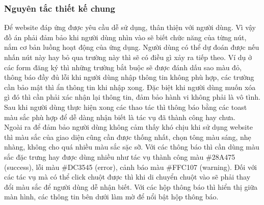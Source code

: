 \documentclass{article}
\begin{document}
\subsubsection{Nguyên tắc thiết kế chung}
Để website đáp ứng được yêu cầu dễ sử dụng, thân thiện với người dùng. Vì vậy đồ án phải đảm bảo khi người dùng nhìn vào sẽ biết chức năng của từng nút, nắm cơ bản luồng hoạt động của ứng dụng. Người dùng có thể dự đoán được nếu nhấn nút này hay bỏ qua trường này thì sẽ có điều gì xảy ra tiếp theo. Ví dụ ở các form đăng ký thì những trường bắt buộc sẽ được đánh dấu sao màu đỏ, thông báo đầy đủ lỗi khi người dùng nhập thông tin không phù hợp, các trường cần bảo mật thì ẩn thông tin khi nhập xong. Đặc biệt khi người dùng muốn xóa gì đó thì cần phải xác nhận lại thông tin, đảm bảo hành vi không phải là vô tình. Sau khi người dùng thực hiện xong các thao tác thì thông báo bằng các toast màu sắc phù hợp để dễ dàng nhận biết là tác vụ đã thành công hay chưa. \\
Ngoài ra để đảm bảo người dùng không cảm thấy khó chịu khi sử dụng website thì màu sắc của giao diện cũng cần được thống nhất, chọn tông màu sáng, nhẹ nhàng, không cho quá nhiều màu sắc sặc sỡ. Với các thông báo thì cần dùng màu sắc đặc trưng hay được dùng nhiều như tác vụ thành công màu \#28A475 (success), lỗi màu \#DC3545 (error), cảnh báo màu \#FFC107 (warning). Đối với các tác vụ mà có thể click chuột được thì khi di chuyển chuột vào sẽ phải thay đổi màu sắc để người dùng dễ nhận biết. Với các hộp thông báo thì hiển thị giữa màn hình, các thông tin bên dưới làm mờ để nổi bật hộp thông báo.
\end{document}
